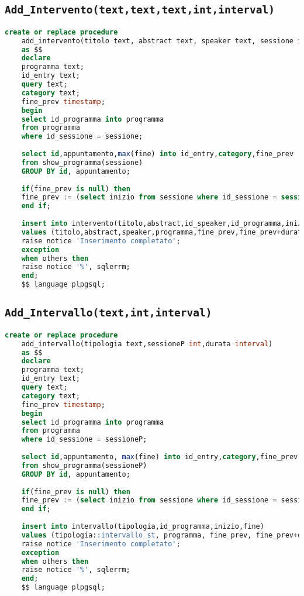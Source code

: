 \subsection{\texttt{Add\_Intervento(text,text,text,int,interval)}}
\begin{lstlisting}[language=SQL,style=mystyle]
	create or replace procedure 
	add_intervento(titolo text, abstract text, speaker text, sessione int,durata interval)
	as $$
	declare
	programma text;
	id_entry text;
	query text;
	category text;
	fine_prev timestamp;
	begin
	select id_programma into programma
	from programma
	where id_sessione = sessione;
	
	select id,appuntamento,max(fine) into id_entry,category,fine_prev
	from show_programma(sessione)
	GROUP BY id, appuntamento;
	
	if(fine_prev is null) then
	fine_prev := (select inizio from sessione where id_sessione = session);
	end if;
	
	insert into intervento(titolo,abstract,id_speaker,id_programma,inizio,fine)
	values (titolo,abstract,speaker,programma,fine_prev,fine_prev+durata);
	raise notice 'Inserimento completato';
	exception
	when others then
	raise notice '%', sqlerrm;
	end;
	$$ language plpgsql;
\end{lstlisting}
\subsection{\texttt{Add\_Intervallo(text,int,interval)}}
\begin{lstlisting}[language=SQL,style=mystyle]
	create or replace procedure 
	add_intervallo(tipologia text,sessioneP int,durata interval)
	as $$
	declare
	programma text;
	id_entry text;
	query text;
	category text;
	fine_prev timestamp;
	begin
	select id_programma into programma
	from programma
	where id_sessione = sessioneP;
	
	select id,appuntamento, max(fine) into id_entry,category,fine_prev
	from show_programma(sessioneP)
	GROUP BY id, appuntamento;
	
	if(fine_prev is null) then
	fine_prev := (select inizio from sessione where id_sessione = sessioneP);
	end if;
	
	insert into intervallo(tipologia,id_programma,inizio,fine)
	values (tipologia::intervallo_st, programma, fine_prev, fine_prev+durata);
	raise notice 'Inserimento completato';
	exception
	when others then
	raise notice '%', sqlerrm;
	end;
	$$ language plpgsql;
\end{lstlisting}
